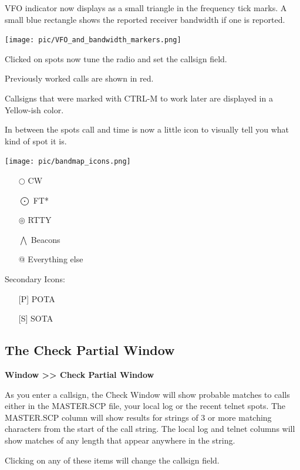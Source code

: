 \documentclass{article}
\begin{document}
VFO indicator now displays as a small triangle in the frequency tick marks. A small blue rectangle shows the reported receiver bandwidth if one is reported.

\vspace{0.5cm}
\texttt{[image: pic/VFO\_and\_bandwidth\_markers.png]}
\vspace{0.5cm}

Clicked on spots now tune the radio and set the callsign field.

Previously worked calls are shown in red.

Callsigns that were marked with CTRL-M to work later are displayed in a Yellow-ish color.

In between the spots call and time is now a little icon to visually tell you what kind of spot it is.

\vspace{0.5cm}
\texttt{[image: pic/bandmap\_icons.png]}
\vspace{0.5cm}

\begin{itemize}
    \item[]  $\bigcirc$ CW
    \item[]  $\bigodot$ FT*
    \item[]  $\circledcirc$ RTTY
    \item[]  $\bigwedge$ Beacons
    \item[]  @ Everything else
\end{itemize}


Secondary Icons:
\begin{itemize}
    \item[]  [P] POTA
    \item[]  [S] SOTA
\end{itemize}


\newpage
\subsection{The Check Partial Window}

\textbf{Window >> Check Partial Window}

As you enter a callsign, the Check Window will show probable matches to calls either in the MASTER.SCP file, your local log or the recent telnet spots. The MASTER.SCP column will show results for strings of 3 or more matching characters from the start of the call string. The local log and telnet columns will show matches of any length that appear anywhere in the string.

Clicking on any of these items will change the callsign field.
\end{document}

